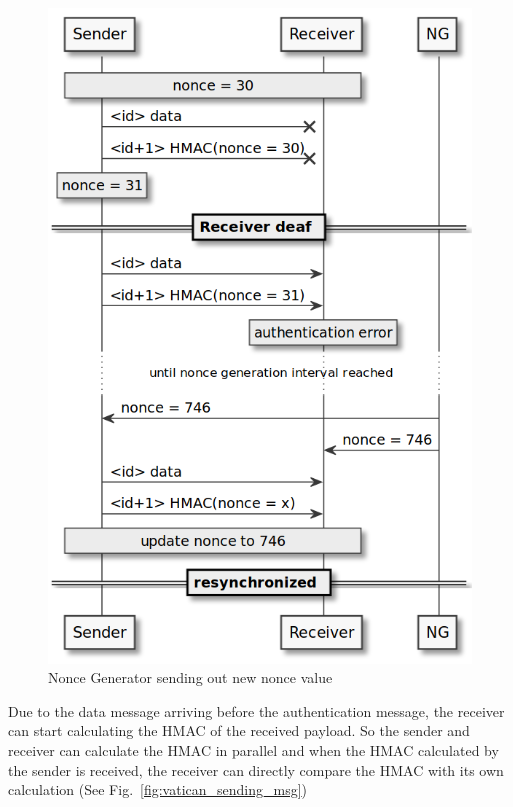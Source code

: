 \begin{figure}[h]
    \centering
    \captionsetup{justification=centering}
	\includegraphics[width=0.8\linewidth]{Figures/VatiCAN_deaf_time.png}
	\caption[]{Nonce Generator sending out new nonce value}
	\label{fig:vatican_deaf_time}
\end{figure}

Due to the data message arriving before the authentication message, the receiver can start calculating the HMAC of the received payload. So the sender and receiver can calculate the HMAC in parallel and when the HMAC calculated by the sender is received, the receiver can directly compare the HMAC with its own calculation (See Fig.~\ref{fig:vatican_sending_msg})

